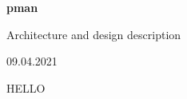 \documentclass[12pt]{article}
\begin{document}
\begin{titlepage}
    \thispagestyle{firststyle}

    \begin{flushleft}
        \vspace*{10cm}

        {\huge \huge \textbf{pman}}

        \vspace{0.5cm}
        {\large Architecture and design description}

        \vfill

        \vspace{0.8cm}

        {\large 09.04.2021}
    \end{flushleft}

\end{titlepage}


HELLO
\end{document}
